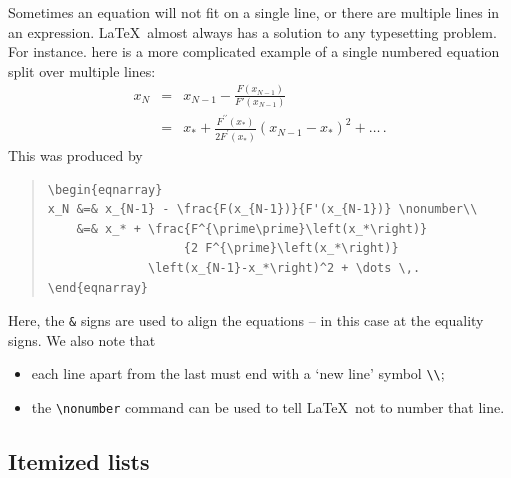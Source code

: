 Sometimes an equation will not fit on a single line, or there are
multiple lines in an expression. \LaTeX\ almost always has a solution
to any typesetting problem. For instance. here is a more complicated
example of a single numbered equation split over multiple lines:
\begin{eqnarray}
x_N &=& x_{N-1} - \frac{F(x_{N-1})}{F'(x_{N-1})} \nonumber\\
    &=& x_* + \frac{F^{\prime\prime}\left(x_*\right)}
                   {2 F^{\prime}\left(x_*\right)}
              \left(x_{N-1}-x_*\right)^2 + \dots \,.
\end{eqnarray}
This was produced by
\begin{quote}
\begin{verbatim}
\begin{eqnarray}
x_N &=& x_{N-1} - \frac{F(x_{N-1})}{F'(x_{N-1})} \nonumber\\
    &=& x_* + \frac{F^{\prime\prime}\left(x_*\right)}
                   {2 F^{\prime}\left(x_*\right)}
              \left(x_{N-1}-x_*\right)^2 + \dots \,.
\end{eqnarray}
\end{verbatim}
\end{quote}
Here, the \verb|&| signs are used to align the equations -- in this
case at the equality signs. We also note that
\begin{itemize}
\item each line apart from the last must end with a `new line' symbol
  \verb|\\|;
\item the \verb|\nonumber| command can be used to tell \LaTeX\ not to
  number that line.
\end{itemize}

\subsection{Itemized lists}

